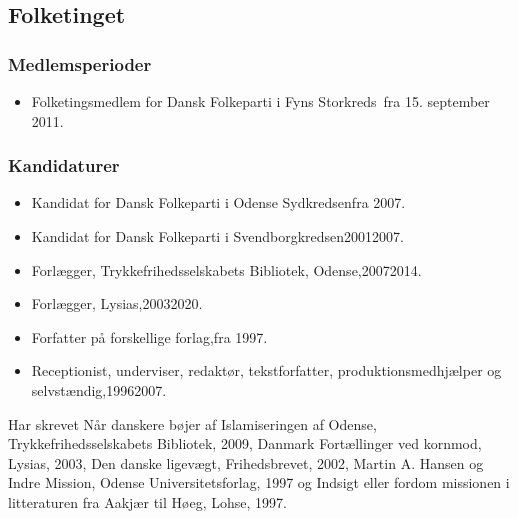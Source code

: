 \documentclass[11pt, a4paper]{awesome-cv}
\begin{document}
\begin{cvletter}
\subsection*{Folketinget}
\subsubsection*{Medlemsperioder}
\begin{itemize}
\item Folketingsmedlem for Dansk Folkeparti i Fyns Storkreds fra 15. september 2011.
\end{itemize}
\subsubsection*{Kandidaturer}
\begin{itemize}
\item Kandidat for Dansk Folkeparti i Odense Sydkredsenfra 2007.
\item Kandidat for Dansk Folkeparti i Svendborgkredsen20012007.
\end{itemize}
\begin{itemize}
\item Forlægger, Trykkefrihedsselskabets Bibliotek, Odense,20072014.
\item Forlægger, Lysias,20032020.
\item Forfatter på forskellige forlag,fra 1997.
\item Receptionist, underviser, redaktør, tekstforfatter, produktionsmedhjælper og selvstændig,19962007.
\end{itemize}
Har skrevet Når danskere bøjer af  Islamiseringen af Odense, Trykkefrihedsselskabets Bibliotek, 2009, Danmark  Fortællinger ved kornmod, Lysias, 2003, Den danske ligevægt, Frihedsbrevet, 2002, Martin A. Hansen og Indre Mission, Odense Universitetsforlag, 1997 og Indsigt eller fordom  missionen i litteraturen fra Aakjær til Høeg, Lohse, 1997.

\end{cvletter}
\end{document}
